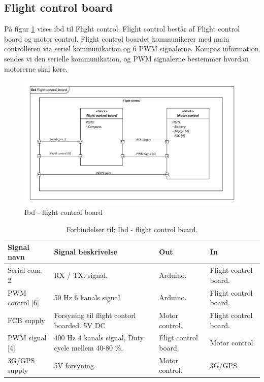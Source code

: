 \subsection{Flight control board}

På figur \ref{fig:ibd_flightcontrolboard} vises ibd til Flight control. Flight control består af Flight control board og motor control. Flight control boardet kommunikerer med main controlleren via seriel kommunikation og 6 PWM signalerne. Kompas information sendes vi den serielle kommunikation, og PWM signalerne bestemmer hvordan motorerne skal køre. 

\begin{figure}[H]
\centering
\includegraphics[width=1\textwidth]{Billeder/IBD/ibd5_flightcontrolboard.pdf}
\vspace{-1cm}
\caption{Ibd - flight control board}
\label{fig:ibd_flightcontrolboard}
\end{figure}

\begin{table}[H]
	\centering
		\begin{tabular}{|p{2.6 cm}|p{4.9 cm}|p{2.5 cm}|p{2.5 cm}|} 
		\hline
			\textbf{Signal navn} 	& \textbf{Signal beskrivelse}		& \textbf{Out} 				& \textbf{In}     \\ \hline
			Serial com. 2 & RX / TX. signal. & Arduino. & Flight control board.			    \\ \hline
			PWM control [6] & 50 Hz 6 kanals signal & Arduino. & Flight control board.				\\ \hline
			FCB supply &  Forsyning til flight contorl boarded. 5V DC & Motor control. & Flight control board.	\\ \hline
			PWM signal [4] & 400 Hz 4 kanals signal, Duty cycle mellem 40-80 $\%$. & Fligt control board. & Motor control.   \\ \hline 
			3G/GPS supply & 5V forsyning. & Motor control. & 3G/GPS.  \\ \hline 
		\end{tabular}
	\caption{Forbindelser til: Ibd - flight control board. }
	\label{tab:ibd_Flight_control_board}
\end{table}



